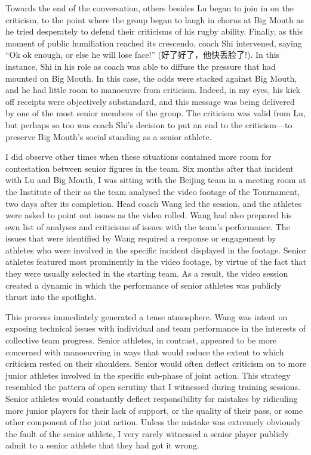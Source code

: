 \begin{CJK}{UTF8}{gbsn}
Towards the end of the conversation, others besides Lu began to join in on the criticism, to the point where the group began to laugh in chorus at Big Mouth as he tried desperately to defend their criticisms of his rugby ability.  Finally, as this moment of public humiliation reached its crescendo, coach Shi intervened, saying ``Ok ok enough, or else he will lose face!'' (好了好了，他快丢脸了!).  In this instance, Shi in his role as coach was able to diffuse the pressure that had mounted on Big Mouth. In this case, the odds were stacked against Big Mouth, and he had little room to manoeuvre from criticism.  Indeed, in my eyes, his kick off receipts were objectively substandard, and this message was being delivered by one of the most senior members of the group. The criticism was valid from Lu, but perhaps so too was coach Shi's decision to put an end to the criticism---to preserve Big Mouth's social standing as a senior athlete.

I did observe other times when these situations contained more room for contestation between senior figures in the team.  Six months after that incident with Lu and Big Mouth, I was sitting with the Beijing team in a meeting room at the Institute of their as the team analysed the video footage of the Tournament, two days after its completion.  Head coach Wang led the session, and the athletes were asked to point out issues as the video rolled.  Wang had also prepared his own list of analyses and criticisms of issues with the team's performance.  The issues that were identified by Wang required a response or engagement by athletes who were involved in the specific incident displayed in the footage.  Senior athletes featured most prominently in the video footage, by virtue of the fact that they were usually selected in the starting team.  As a result, the video session created a dynamic in which the performance of senior athletes was publicly thrust into the spotlight.

This process immediately generated a tense atmosphere.  Wang was intent on exposing technical issues with individual and team performance in the interests of collective team progress.  Senior athletes, in contrast, appeared to be more concerned with manoeuvring in ways that would reduce the extent to which criticism rested on their shoulders.  Senior would often deflect criticism on to more junior athletes involved in the specific sub-phase of joint action.    This strategy resembled the pattern of open scrutiny that I witnessed during training sessions.  Senior athletes would constantly deflect responsibility for mistakes by ridiculing more junior players for their lack of support, or the quality of their pass, or some other component of the joint action.  Unless the mistake was extremely obviously the fault of the senior athlete, I very rarely witnessed a senior player publicly admit to a senior athlete that they had got it wrong.


\end{CJK}
